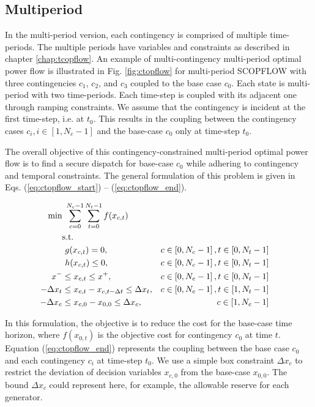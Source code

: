 \subsection{Multiperiod}

In the multi-period version, each contingency is comprised of multiple time-periods. The multiple periods have variables and constraints as described in chapter \ref{chap:tcopflow}. An example of multi-contingency multi-period optimal power flow is illustrated in Fig. \ref{fig:ctopflow} for multi-period SCOPFLOW with three contingencies $c_1$, $c_2$, and $c_3$ coupled to the base case $c_0$. Each state is multi-period with two time-periods. Each time-step is coupled with its adjacent one through ramping constraints. We assume that the contingency is incident at the first time-step, i.e. at $t_0$. This results in the coupling between the contingency cases $c_i, i \in [1,N_c-1]$ and the base-case $c_0$ only at time-step $t_0$.



The overall objective of this contingency-constrained multi-period optimal power flow is to find a secure dispatch for base-case $c_0$ while adhering to contingency and temporal constraints. The general formulation of this problem is given in Eqs. (\ref{eq:ctopflow_start}) -- (\ref{eq:ctopflow_end}).

\begin{align}
\centering
\text{min}&~\sum_{c=0}^{N_c-1}\sum_{t=0}^{N_t-1}f(x_{c,t})& \label{eq:ctopflow_start}\\
&\text{s.t.}& \nonumber \\
&~g(x_{c,t}) = 0,                                        &c \in \left[0,N_c-1\right], t \in \left[0,N_t-1\right]& \\
&~h(x_{c,t}) \le 0,                                      &c \in \left[0,N_c-1\right], t \in \left[0,N_t-1\right]& \\
x^- & \le x_{c,t} \le x^+,                               &c \in \left[0,N_c-1\right], t\in \left[0,N_t-1\right]& \\
-\Delta x_t & \le x_{c,t} - x_{c,t-\Delta{t}} \le \Delta x_t,&c \in \left[0,N_c-1\right], t \in \left[1,N_t-1\right]& \label{eq:ctopflow_time_coupling}\\
-\Delta x_c & \le x_{c,0} - x_{0,0} \le \Delta x_c,&c \in \left[1,N_c-1\right]& \\
\label{eq:ctopflow_end}
\end{align}

In this formulation, the objective is to reduce the cost for the base-case time
horizon, where $f(x_{0,t})$ is the objective cost for contingency $c_0$ at time
$t$. Equation (\ref{eq:ctopflow_end}) represents the coupling between the base
case $c_0$ and each contingency $c_i$ at time-step $t_0$. We use a simple box
constraint $\Delta x_c$ to restrict the  deviation of decision variables
$x_{c,0}$ from the base-case $x_{0,0}$. The bound $\Delta x_c$ could represent here, for example, the allowable reserve for each generator.

